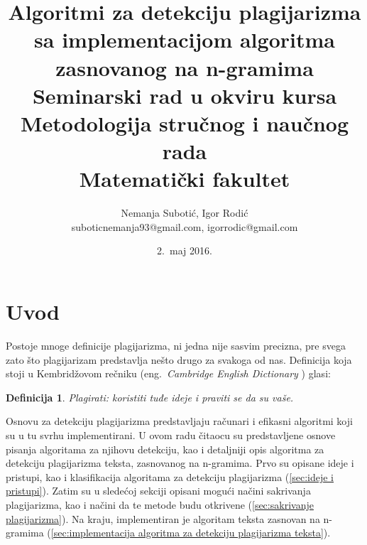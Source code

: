 \documentclass[a4paper]{article}
\newtheorem{definicija}{Definicija}[section]
\begin{document}
\title{Algoritmi za detekciju plagijarizma sa implementacijom algoritma zasnovanog na n-gramima \\ \small{Seminarski rad u okviru kursa\\ Metodologija stručnog i naučnog rada\\ Matematički fakultet}}

\author{Nemanja Subotić, Igor Rodić \\ suboticnemanja93@gmail.com, igorrodic@gmail.com}
\date{2.~maj 2016.}
\maketitle


\tableofcontents

\newpage

\section{Uvod}
\label{sec:uvod}

Postoje mnoge definicije plagijarizma, ni jedna nije sasvim precizna, pre svega zato što plagijarizam predstavlja nešto drugo za svakoga od nas. Definicija koja stoji u Kembridžovom rečniku (eng.~{\em Cambridge English Dictionary} \cite{cambridge}) glasi:
\begin{definicija}
Plagirati: koristiti tuđe ideje i praviti se da su vaše.
\end{definicija}
\par Osnovu za detekciju plagijarizma predstavljaju računari i efikasni algoritmi koji su u tu svrhu implementirani. U ovom radu čitaocu su predstavljene osnove pisanja algoritama za njihovu detekciju, kao i detaljniji opis algoritma za detekciju plagijarizma teksta, zasnovanog na n-gramima. Prvo su opisane ideje i pristupi, kao i klasifikacija algoritama za detekciju plagijarizma (\ref{sec:ideje i pristupi}). Zatim su u sledećoj sekciji opisani mogući načini sakrivanja plagijarizma, kao i načini da te metode budu otkrivene (\ref{sec:sakrivanje plagijarizma}). Na kraju, implementiran je algoritam teksta zasnovan na n-gramima (\ref{sec:implementacija algoritma za detekciju plagijarizma teksta}).
\end{document}
